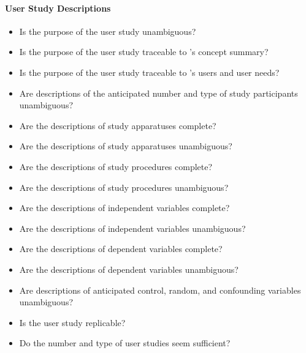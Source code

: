 \paragraph{User Study Descriptions}
\begin{itemize}

    \item Is the purpose of the user study unambiguous?

    \item Is the purpose of the user study traceable to \progname{}'s concept
    summary?

    \item Is the purpose of the user study traceable to \progname{}'s users and
    user needs?

    \item Are descriptions of the anticipated number and type of study
    participants unambiguous?

    \item Are the descriptions of study apparatuses complete?

    \item Are the descriptions of study apparatuses unambiguous?

    \item Are the descriptions of study procedures complete?

    \item Are the descriptions of study procedures unambiguous?

    \item Are the descriptions of independent variables complete?

    \item Are the descriptions of independent variables unambiguous?

    \item Are the descriptions of dependent variables complete?

    \item Are the descriptions of dependent variables unambiguous?

    \item Are descriptions of anticipated control, random, and confounding
    variables unambiguous?

    \item Is the user study replicable?

    \item Do the number and type of user studies seem sufficient?

\end{itemize}